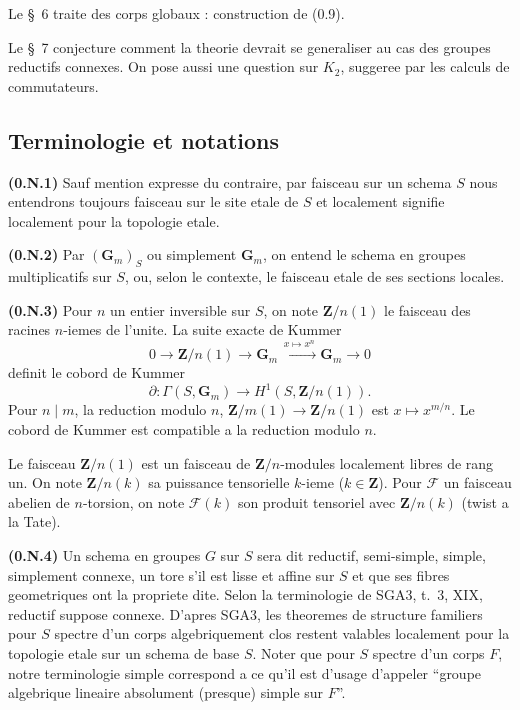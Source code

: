 \documentclass[11pt,a4paper]{article}
\theoremstyle{plain}
\theoremstyle{definition}
\begin{document}
Le \S~6 traite des corps globaux : construction de (0.9).

Le \S~7 conjecture comment la theorie devrait se generaliser au cas des groupes reductifs connexes. On pose aussi une question sur $K_2$, suggeree par les calculs de commutateurs.

\subsection*{Terminologie et notations}

\textbf{(0.N.1)} Sauf mention expresse du contraire, par faisceau sur un schema $S$ nous entendrons toujours faisceau sur le site etale de $S$ et localement signifie localement pour la topologie etale.

\textbf{(0.N.2)} Par $(\mathbf{G}_m)_S$ ou simplement $\mathbf{G}_m$, on entend le schema en groupes multiplicatifs sur $S$, ou, selon le contexte, le faisceau etale de ses sections locales.

\textbf{(0.N.3)} Pour $n$ un entier inversible sur $S$, on note $\mathbf{Z}/n(1)$ le faisceau des racines $n$-iemes de l'unite. La suite exacte de Kummer
\[
0 \to \mathbf{Z}/n(1) \to \mathbf{G}_m \xrightarrow{\,x \mapsto x^n\,} \mathbf{G}_m \to 0
\]
definit le cobord de Kummer
\[
\partial : \Gamma(S, \mathbf{G}_m) \to H^1(S, \mathbf{Z}/n(1)).
\]
Pour $n \mid m$, la reduction modulo $n$, $\mathbf{Z}/m(1) \to \mathbf{Z}/n(1)$ est $x \mapsto x^{m/n}$. Le cobord de Kummer est compatible a la reduction modulo $n$.

Le faisceau $\mathbf{Z}/n(1)$ est un faisceau de $\mathbf{Z}/n$-modules localement libres de rang un. On note $\mathbf{Z}/n(k)$ sa puissance tensorielle $k$-ieme ($k \in \mathbf{Z}$). Pour $\mathscr{F}$ un faisceau abelien de $n$-torsion, on note $\mathscr{F}(k)$ son produit tensoriel avec $\mathbf{Z}/n(k)$ (twist a la Tate).

\textbf{(0.N.4)} Un schema en groupes $G$ sur $S$ sera dit reductif, semi-simple, simple, simplement connexe, un tore s'il est lisse et affine sur $S$ et que ses fibres geometriques ont la propriete dite. Selon la terminologie de SGA3, t.~3, XIX, reductif suppose connexe. D'apres SGA3, les theoremes de structure familiers pour $S$ spectre d'un corps algebriquement clos restent valables localement pour la topologie etale sur un schema de base $S$. Noter que pour $S$ spectre d'un corps $F$, notre terminologie simple correspond a ce qu'il est d'usage d'appeler ``groupe algebrique lineaire absolument (presque) simple sur $F$''.
\end{document}

